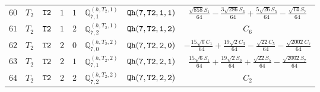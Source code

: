 \documentclass[fleqn,8pt]{jsarticle}
\begin{document}
\begin{table}[ht!]
\begin{center}
\begin{tabular}{cccccccc}
$ 60 $ & $ T_{2} $ & $ {\tt T2} $ & $ 1 $ & $ 1 $ & $ \mathbb{Q}_{7,1}^{(h,T_{2},1)} $ & $ {\tt Qh(7,T2,1,1)} $ & $ \frac{\sqrt{858} S_{1}}{64} - \frac{3 \sqrt{286} S_{3}}{64} + \frac{5 \sqrt{26} S_{5}}{64} - \frac{\sqrt{14} S_{7}}{64} $ \\
$ 61 $ & $ T_{2} $ & $ {\tt T2} $ & $ 1 $ & $ 2 $ & $ \mathbb{Q}_{7,2}^{(h,T_{2},1)} $ & $ {\tt Qh(7,T2,1,2)} $ & $ C_{6} $ \\
$ 62 $ & $ T_{2} $ & $ {\tt T2} $ & $ 2 $ & $ 0 $ & $ \mathbb{Q}_{7,0}^{(h,T_{2},2)} $ & $ {\tt Qh(7,T2,2,0)} $ & $ - \frac{15 \sqrt{6} C_{1}}{64} + \frac{19 \sqrt{2} C_{3}}{64} - \frac{\sqrt{22} C_{5}}{64} - \frac{\sqrt{2002} C_{7}}{64} $ \\
$ 63 $ & $ T_{2} $ & $ {\tt T2} $ & $ 2 $ & $ 1 $ & $ \mathbb{Q}_{7,1}^{(h,T_{2},2)} $ & $ {\tt Qh(7,T2,2,1)} $ & $ \frac{15 \sqrt{6} S_{1}}{64} + \frac{19 \sqrt{2} S_{3}}{64} + \frac{\sqrt{22} S_{5}}{64} - \frac{\sqrt{2002} S_{7}}{64} $ \\
$ 64 $ & $ T_{2} $ & $ {\tt T2} $ & $ 2 $ & $ 2 $ & $ \mathbb{Q}_{7,2}^{(h,T_{2},2)} $ & $ {\tt Qh(7,T2,2,2)} $ & $ C_{2} $ \\
 \hline \hline
\end{tabular}
\end{center}
\end{table}
\end{document}
